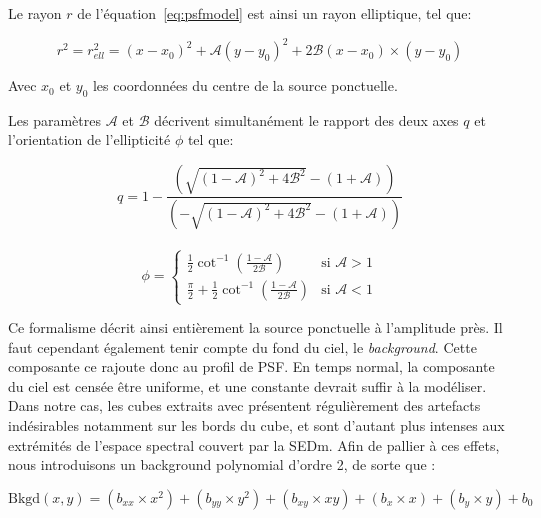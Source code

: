 \documentclass[../main/main.tex]{subfiles}
\begin{document}
Le rayon $r$ de l'équation~\ref{eq:psfmodel} est ainsi un rayon
elliptique, tel que:

\begin{equation}
  \label{eq:ellipticity}
  r^{2}=r_{ell}^{2}=(x-x_{0})^{2}+\mathcal{A}(y-y_{0})^{2}+2\mathcal{B}(x-x_{0})\times(y-y_{0})
\end{equation}

Avec $x_{0}$ et $y_{0}$ les coordonnées du centre de la source
ponctuelle.

Les paramètres $\mathcal{A}$ et $\mathcal{B}$ décrivent simultanément le
rapport des deux axes $q$ et l'orientation de l'ellipticité $\phi$ tel
que:

\begin{equation}
  \label{eq:axesratioellipse}
  q=1-\frac{\left( \sqrt{(1-\mathcal{A})^{2}+4\mathcal{B}^{2}}-(1+\mathcal{A})\right)}{\left( -\sqrt{(1-\mathcal{A})^{2}+4\mathcal{B}^{2}}-(1+\mathcal{A})\right)}
\end{equation}\\

\begin{equation}
  \label{eq:angleellipse}
  \phi= \left\{
    \begin{array}{ll}
        \frac{1}{2}\cot^{-1}\left(\frac{1-\mathcal{A}}{2\mathcal{B}}\right) & \mbox{si } \mathcal{A}>1 \\
         \frac{\pi}{2}+\frac{1}{2}\cot^{-1}\left(\frac{1-\mathcal{A}}{2\mathcal{B}}\right) & \mbox{si } \mathcal{A}<1 
    \end{array}
\right.
\end{equation}


Ce formalisme décrit ainsi entièrement la source ponctuelle à
l'amplitude près. Il faut cependant également tenir compte du fond du
ciel, le \textit{background}. Cette composante ce rajoute donc au profil
de PSF. En temps normal, la composante du ciel est censée être uniforme,
et une constante devrait suffir à la modéliser. Dans notre cas, les
cubes extraits avec  \citep{pysedm} présentent régulièrement
des artefacts indésirables notamment sur les bords du cube, et sont
d'autant plus intenses aux extrémités de l'espace spectral couvert par
la SEDm. Afin de pallier à ces effets, nous introduisons un background
polynomial d'ordre 2, de sorte que :

\begin{equation}
  \label{eq:backgroundcurved}
  \text{Bkgd}(x,y) = (b_{xx}\times x^{2})+ (b_{yy}\times y^{2})+(b_{xy}\times xy)+(b_{x}\times x)+(b_{y}\times y) + b_{0}
\end{equation}
\end{document}
